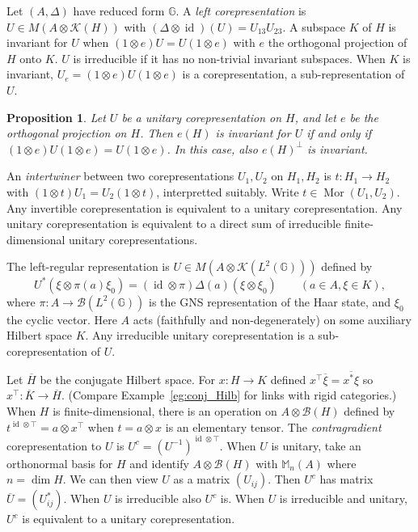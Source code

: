 \documentclass[a4paper,11pt]{article}
\theoremstyle{plain}
\newtheorem{proposition}{Proposition}[section]
\theoremstyle{remark}
\newcommand{\mc}[1]{\mathcal{#1}}
\newcommand{\id}{\operatorname{id}}
\newcommand{\G}{\mathbb{G}}
\newcommand{\mor}{\operatorname{Mor}}
\begin{document}
Let $(A,\Delta)$ have reduced form $\G$.  A \emph{left corepresentation} is $U \in M(A \otimes \mc K(H))$ with $(\Delta\otimes\id)(U) = U_{13} U_{23}$.  A subspace $K$ of $H$ is invariant for $U$ when $(1\otimes e)U = U(1\otimes e)$ with $e$ the orthogonal projection of $H$ onto $K$.  $U$ is irreducible if it has no non-trivial invariant subspaces.  When $K$ is invariant, $U_e = (1\otimes e)U(1\otimes e)$ is a corepresentation, a sub-representation of $U$.

\begin{proposition}
Let $U$ be a unitary corepresentation on $H$, and let $e$ be the orthogonal projection on $H$.  Then $e(H)$ is invariant for $U$ if and only if $(1\otimes e) U (1\otimes e) = U (1\otimes e)$.  In this case, also $e(H)^\perp$ is invariant.
\end{proposition}

An \emph{intertwiner} between two corepresentations $U_1, U_2$ on $H_1, H_2$ is $t\colon H_1\to H_2$ with $(1\otimes t)U_1 = U_2(1\otimes t)$, interpretted suitably.  Write $t\in\mor(U_1, U_2)$.  Any invertible corepresentation is equivalent to a unitary corepresentation.  Any unitary corepresentation is equivalent to a direct sum of irreducible finite-dimensional unitary corepresentations.

The left-regular representation is $U \in M(A\otimes \mc K(L^2(\G)))$ defined by
\[ U^*(\xi\otimes \pi(a)\xi_0) = (\id\otimes\pi) \Delta(a)(\xi\otimes\xi_0) \qquad (a\in A, \xi\in K), \]
where $\pi\colon A\to\mc B(L^2(\G))$ is the GNS representation of the Haar state, and $\xi_0$ the cyclic vector.  Here $A$ acts (faithfully and non-degenerately) on some auxiliary Hilbert space $K$.  Any irreducible unitary corepresentation is a sub-corepresentation of $U$.

Let $\overline H$ be the conjugate Hilbert space.  For $x\colon H\to K$ defined $x^\top\overline\xi = \overline{x^*\xi}$ so $x^\top \colon \overline{K} \to \overline{H}$.  (Compare Example~\ref{eg:conj_Hilb} for links with rigid categories.)   When $H$ is finite-dimensional, there is an operation on $A \otimes \mc B(H)$ defined by $t^{\id\otimes\top} = a \otimes x^\top$ when $t = a\otimes x$ is an elementary tensor.  The \emph{contragradient} corepresentation to $U$ is $U^c = (U^{-1})^{\id\otimes\top}$.  When $U$ is unitary, take an orthonormal basis for $H$ and identify $A\otimes\mc B(H)$ with $\mathbb M_n(A)$ where $n = \dim H$.  We can then view $U$ as a matrix $(U_{ij})$.  Then $U^c$ has matrix $\overline{U} = (U_{ij}^*)$.  When $U$ is irreducible also $U^c$ is.  When $U$ is irreducible and unitary, $U^c$ is equivalent to a unitary corepresentation.
\end{document}
